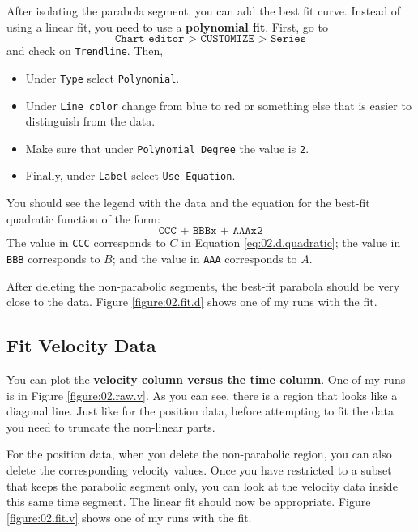 After isolating the parabola segment, you can add the best fit curve. Instead of using a linear fit, you need to use a \textbf{polynomial fit}. First, go to
\begin{equation}
    \texttt{Chart editor > CUSTOMIZE > Series}
\end{equation}
and check on \texttt{Trendline}. Then,
\begin{itemize}
    \item Under \texttt{Type} select \texttt{Polynomial}.
    \item Under \texttt{Line color} change from blue to red or something else that is easier to distinguish from the data.
    \item Make sure that under \texttt{Polynomial Degree} the value is \texttt{2}.
    \item Finally, under \texttt{Label} select \texttt{Use Equation}.
\end{itemize}
You should see the legend with the data and the equation for the best-fit quadratic function of the form:
\begin{equation}
    \texttt{CCC + BBBx + AAAx\^{}2}
\end{equation}
The value in \texttt{CCC} corresponds to $C$ in Equation \ref{eq:02.d.quadratic}; the value in \texttt{BBB} corresponds to $B$; and the value in \texttt{AAA} corresponds to $A$.

After deleting the non-parabolic segments, the best-fit parabola should be very close to the data. Figure \ref{figure:02.fit.d} shows one of my runs with the fit.
\subsection{Fit Velocity Data}
You can plot the \textbf{velocity column versus the time column}. One of my runs is in Figure \ref{figure:02.raw.v}. As you can see, there is a region that looks like a diagonal line. Just like for the position data, before attempting to fit the data you need to truncate the non-linear parts.

For the position data, when you delete the non-parabolic region, you can also delete the corresponding velocity values. Once you have restricted to a subset that keeps the parabolic segment only, you can look at the velocity data inside this same time segment. The linear fit should now be appropriate. Figure \ref{figure:02.fit.v} shows one of my runs with the fit.
